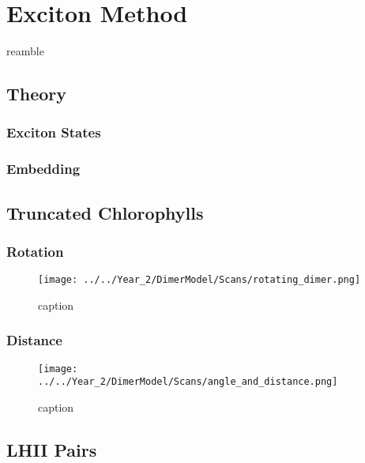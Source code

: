 %
%
\let\textcircled=\pgftextcircled
\chapter{Exciton Method}
\label{chap:excitons}

reamble

\section{Theory}
\label{sec:exciton_theory}

\subsection{Exciton States}
\label{subsec:exciton_states}

\subsection{Embedding}
\label{subsec:embedding}

\section{Truncated Chlorophylls}
\label{sec:trunc_chl}

\subsection{Rotation}
\label{subsec:rotation}

\begin{figure}
    \texttt{[image: ../../Year\_2/DimerModel/Scans/rotating\_dimer.png]}
    \caption{caption}
\end{figure}

\subsection{Distance}
\label{subsec:distance}
\begin{figure}
    \texttt{[image: ../../Year\_2/DimerModel/Scans/angle\_and\_distance.png]}
    \caption{caption}
\end{figure}

\section{LHII Pairs}
\label{sec:LHII_excitons}

